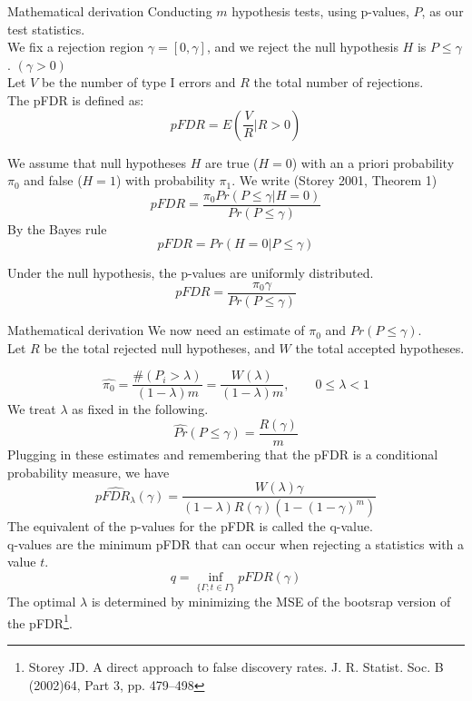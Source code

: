 \documentclass[8pt]{beamer}
\begin{document}
\begin{frame}{Mathematical derivation}
Conducting $m$ hypothesis tests, using p-values, $P$, as our test statistics.\\
We fix a rejection region $\gamma=[0, \gamma]$, and we reject the null hypothesis $H$ is $P\leq\gamma$. $(\gamma>0)$\\
Let $V$ be the number of type I errors and $R$ the total number of rejections.\\
The pFDR is defined as: 
\begin{equation*}
pFDR=E\left(\frac{V}{R}| R>0 \right)
\end{equation*}

We assume that null hypotheses $H$ are true ($H=0$) with an a priori probability $\pi_0$ and false ($H=1$) with probability $\pi_1$. We write (Storey 2001, Theorem 1)\\
\begin{equation*}
pFDR=\frac{\pi_0 Pr(P\leq\gamma|H=0)}{Pr(P\leq\gamma)}
\end{equation*}
By the Bayes rule 
\begin{equation*}
pFDR = Pr(H=0|P\leq\gamma)
\end{equation*}

Under the null hypothesis, the p-values are uniformly distributed. 
\begin{equation*}
pFDR=\frac{\pi_0\gamma}{Pr(P\leq\gamma)}
\end{equation*} 
\end{frame}

\begin{frame}{Mathematical derivation}
We now need an estimate of $\pi_0$ and $Pr(P\leq\gamma)$.\\ 
Let $R$ be the total rejected null hypotheses, and $W$ the total accepted hypotheses. 

\begin{equation*}
\hat{\pi_0}=\frac{\#(P_i>\lambda)}{(1-\lambda)m}=\frac{W(\lambda)}{(1-\lambda)m}, \qquad 0\leq\lambda< 1
\end{equation*}
We treat $\lambda$ as fixed in the following. 
\begin{equation*}
\hat{Pr}(P\leq\gamma)=\frac{R(\gamma)}{m}
\end{equation*}
Plugging in these estimates and remembering that the pFDR is a conditional probability measure, we have 
\begin{equation*}
p\hat{FDR}_\lambda (\gamma)=\frac{W(\lambda)\gamma}{(1-\lambda)R(\gamma)(1-(1-\gamma)^m)}
\end{equation*}
The equivalent of the p-values for the pFDR is called the q-value.\\
q-values are the minimum pFDR that can occur when rejecting a statistics with a value $t$. 
\begin{equation*}
q = \inf_{\{\Gamma; t\in\Gamma\}}pFDR(\gamma)
\end{equation*}
The optimal $\lambda$ is determined by minimizing the MSE of the bootsrap version of the pFDR\footnote{Storey JD. A direct approach to false discovery rates. J. R. Statist. Soc. B (2002)64, Part 3, pp. 479–498}. 
\end{frame}
\end{document}
